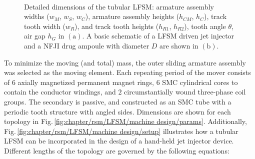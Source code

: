         
        \begin{figure}
            \centering
            \\
            \caption{ 
                \label{fig:chapter/rsm/LFSM/machine design}Detailed dimensions of the tubular LFSM: 
                armature assembly widths ($w_M$, $w_S$, $w_C$),
                armature assembly heights ($h_{CM}$, $h_{C}$),
                track tooth width ($w_{R}$),
                and track tooth heights ($h_{R1}$, $h_{R2}$), tooth angle $\theta$, air gap $h_G$ in $\mathrm{(a)}$. A basic schematic of a LFSM driven jet injector and a NFJI drug ampoule with diameter $D$ are shown in $\mathrm{(b)}$.
            }
        \end{figure}
        
        
        To minimize the moving (and total) mass, the outer sliding armature assembly was selected as the moving element. Each repeating period of the mover consists of $6$ axially magnetized permanent magnet rings, $6$ \acf{SMC} cylindrical cores to contain the conductor windings, and $2$ circumstantially wound three-phase coil groups. The secondary is passive, and constructed as an SMC tube with a periodic tooth structure with angled sides. Dimensions are shown for each topology in Fig.\,\ref{fig:chapter/rsm/LFSM/machine design/params}. Additionally, Fig.\,\ref{fig:chapter/rsm/LFSM/machine design/setup} illustrates how a tubular \acs{LFSM} can be incorporated in the design of a hand-held jet injector device. Different lengths of the topology are governed by the following equations:
        
